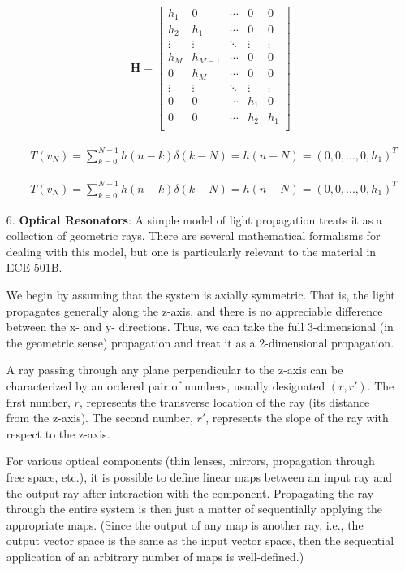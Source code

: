 \documentclass[fleqn]{article}
\begin{document}
\begin{enumerate}[nolistsep]
\begin{enumerate}
			\begin{align*}
				\mathbf{H} =
				\begin{bmatrix}
					h_1 		& 0 			& \cdots 	& 0 			& 0\\
					h_2 		& h_1 		& \cdots 	& 0 			& 0\\
					\vdots 	& \vdots 	& \ddots 	& \vdots 	& \vdots\\
					h_M 		& h_{M-1} 	& \cdots 	& 0 			& 0\\
					0 		& h_M		& \cdots 	& 0 			& 0\\
					\vdots 	& \vdots 	& \ddots 	& \vdots 	& \vdots\\
					0		& 0			& \cdots 	& h_1		& 0\\       
					0 		& 0			& \cdots 	& h_2		& h_1\\
				\end{bmatrix}
			\end{align*}
			
			\begin{align*}
				T(v_N) = \sum_{k=0}^{N-1}{h(n-k)\delta(k-N)} = h(n-N) = (0, 0,...,0,h_1)^T
			\end{align*}
			
			\begin{align*}
				T(v_N) = \sum_{k=0}^{N-1}{h(n-k)\delta(k-N)} = h(n-N) = (0, 0,...,0,h_1)^T
			\end{align*}
		\end{enumerate}
		\item[6.] \textbf{Optical Resonators}: A simple model of light propagation treats it as a collection of geometric rays. There are several mathematical formalisms for dealing with this model, but one is particularly relevant to the material in ECE 501B.

			We begin by assuming that the system is axially symmetric. That is, the light propagates generally along the z-axis, and there is no appreciable difference between the x- and y- directions. Thus, we can take the full 3-dimensional (in the geometric sense) propagation and treat it as a 2-dimensional propagation.

			A ray passing through any plane perpendicular to the z-axis can be characterized by an ordered pair of numbers, usually designated $(r, r')$. The first number, $r$, represents the transverse location of the ray (its distance from the z-axis). The second number, $r'$, represents the slope of the ray with respect to the z-axis.
			
			For various optical components (thin lenses, mirrors, propagation through free space, etc.), it is possible to define linear maps between an input ray and the output ray after interaction with the component. Propagating the ray through the entire system is then just a matter of sequentially applying the appropriate maps. (Since the output of any map is another ray, i.e., the output vector space is the same as the input vector space, then the sequential application of an arbitrary number of maps is well-defined.)
			

\end{enumerate}
\end{document}

